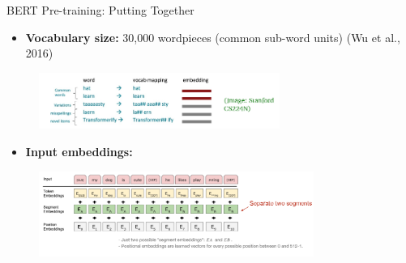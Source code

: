 \documentclass[serif, aspectratio=169]{beamer}
\begin{document}
\begin{frame}{BERT Pre-training: Putting Together}
    \begin{itemize}
        \item \textbf{Vocabulary size:} 30,000 wordpieces (common sub-word units) \textcolor{green!50!black}{(Wu et al., 2016)}
    \end{itemize}
    
    \begin{figure}
        \centering
        \includegraphics[width=0.7\textwidth]{Figures/input embeddings.png}
    \end{figure}
    
    \begin{itemize}
        \item \textbf{Input embeddings:}
    \end{itemize}
    
    \begin{figure}
        \centering
        \includegraphics[width=0.8\textwidth]{Figures/voc.png}
    \end{figure}
\end{frame}
\end{document}
